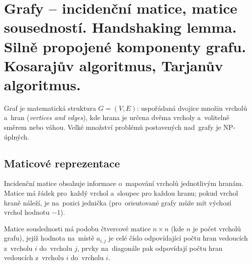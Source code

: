 \clearpage
\section{Grafy -- incidenční matice, matice sousedností. Handshaking lemma. Silně propojené komponenty grafu. Kosarajův algoritmus, Tarjanův algoritmus.}

Graf je matematická struktura $G = (V, E)$: uspořádaná dvojice množin vrcholů a~hran (\emph{vertices and edges}), kde hrana je určena dvěma vrcholy a~volitelně směrem nebo váhou.
Velké množství problémů postavených nad~grafy je NP-úplných.

\subsection{Maticové reprezentace}

Incidenční matice obsahuje informace o~mapování vrcholů jednotlivým hranám.
Matice má řádek pro~každý vrchol a~sloupec pro každou hranu; pokud vrchol hraně náleží, je na~pozici jednička (pro~orientované grafy může mít výchozí vrchol hodnotu $-1$).

Matice souslednosti má podobu čtvercové matice $n \times n$ (kde $n$ je počet vrcholů grafu), jejíž hodnota na~místě $a_{i,j}$ je celé číslo odpovídající počtu hran vedoucích z~vrcholu $i$ do~vrcholu $j$, prvky na~diagonále pak odpovídají počtu hran vedoucích z~vrcholu $i$ do~vrcholu $i$.

